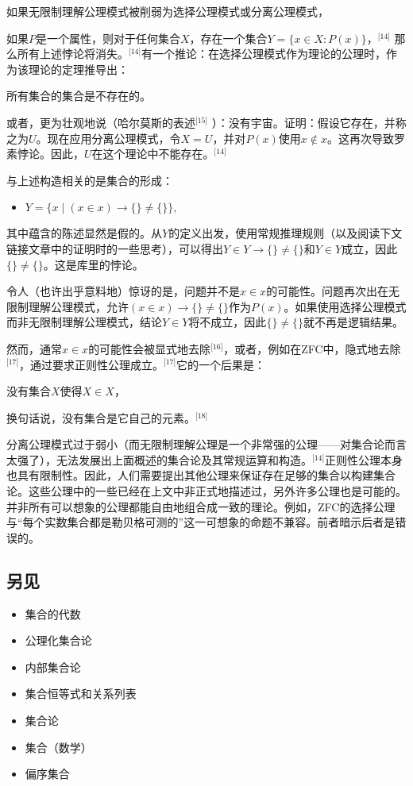 如果无限制理解公理模式被削弱为选择公理模式或分离公理模式，

如果$P$是一个属性，则对于任何集合$X$，存在一个集合$Y = \{x \in X : P(x)\}$，\(^\text{[14]}\) 那么所有上述悖论将消失。\(^\text{[14]}\)有一个推论：在选择公理模式作为理论的公理时，作为该理论的定理推导出：

所有集合的集合是不存在的。

或者，更为壮观地说（哈尔莫斯的表述\(^\text{[15]}\)
）：没有宇宙。证明：假设它存在，并称之为$U$。现在应用分离公理模式，令$X = U$，并对$P(x)$使用$x \notin x$。这再次导致罗素悖论。因此，$U$在这个理论中不能存在。\(^\text{[14]}\)

与上述构造相关的是集合的形成：
\begin{itemize}
\item $Y = \{x \mid (x \in x) \rightarrow \{\} \neq \{\}\},$ 
\end{itemize} 
其中蕴含的陈述显然是假的。从$Y$的定义出发，使用常规推理规则（以及阅读下文链接文章中的证明时的一些思考），可以得出$Y \in Y \rightarrow \{\} \neq \{\}$和$Y \in Y$成立，因此$\{\} \neq \{\}$。这是库里的悖论。

令人（也许出乎意料地）惊讶的是，问题并不是$x \in x$的可能性。问题再次出在无限制理解公理模式，允许$(x \in x) \rightarrow \{\} \neq \{\}$作为$P(x)$。如果使用选择公理模式而非无限制理解公理模式，结论$Y \in Y$将不成立，因此$\{\} \neq \{\}$就不再是逻辑结果。

然而，通常$x \in x$的可能性会被显式地去除\(^\text{[16]}\)，或者，例如在ZFC中，隐式地去除\(^\text{[17]}\)，通过要求正则性公理成立。\(^\text{[17]}\)它的一个后果是：

没有集合$X$使得$X \in X$，

换句话说，没有集合是它自己的元素。\(^\text{[18]}\)

分离公理模式过于弱小（而无限制理解公理是一个非常强的公理——对集合论而言太强了），无法发展出上面概述的集合论及其常规运算和构造。\(^\text{[14]}\)正则性公理本身也具有限制性。因此，人们需要提出其他公理来保证存在足够的集合以构建集合论。这些公理中的一些已经在上文中非正式地描述过，另外许多公理也是可能的。并非所有可以想象的公理都能自由地组合成一致的理论。例如，ZFC的选择公理与“每个实数集合都是勒贝格可测的”这一可想象的命题不兼容。前者暗示后者是错误的。
\subsection{另见}
\begin{itemize}
\item 集合的代数  
\item 公理化集合论  
\item 内部集合论  
\item 集合恒等式和关系列表  
\item 集合论  
\item 集合（数学）  
\item 偏序集合
\end{itemize}
